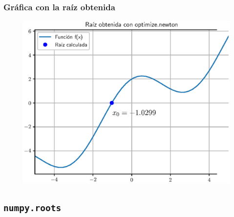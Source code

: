 \documentclass[12pt]{beamer}
\begin{document}
\begin{frame}
\frametitle{Gráfica con la raíz obtenida}
\begin{figure}
    \centering
    \includegraphics[scale=0.55]{Imagenes/raices_scipy_newton_02.eps}
\end{figure}
\end{frame}

\subsection{\texttt{numpy.roots}}
\end{document}
